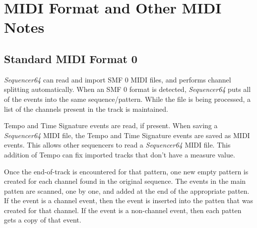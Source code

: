 %
%
%

\section{MIDI Format and Other MIDI Notes}
\label{sec:midi_format_and_midi_notes}

\subsection{Standard MIDI Format 0}
\label{subsec:midi_format_smf_0}

   \textsl{Sequencer64} can read and import SMF 0 MIDI files, and performs
   channel splitting automatically.
   When an SMF 0 format is detected, \textsl{Sequencer64}
   puts all of the events into the
   same sequence/pattern.  While the file is being processed, a list of the
   channels present in the track is maintained.

   Tempo and Time Signature events are read, if present.
   When saving a \textsl{Sequencer64} MIDI file,
   the Tempo and Time Signature events are saved as MIDI events.
   This allows other sequencers to read a \textsl{Sequencer64} MIDI file.
   This addition of Tempo can fix imported tracks that don't have a
   measure value.

   Once the end-of-track is encountered for that pattern, one new empty
   pattern is created for each channel found in the original sequence.
   The events in the main patten are scanned, one by one, and added at the
   end of the appropriate patten.  If the event is a channel event,
   then the event is inserted into the patten that was created for that
   channel.  If the event is a non-channel event, then each patten gets a
   copy of that event.

